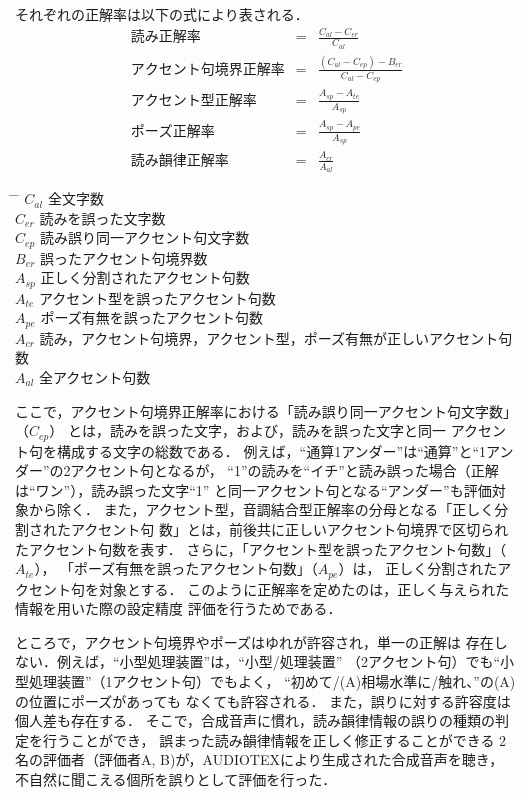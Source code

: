 それぞれの正解率は以下の式により表される．
\begin{eqnarray}
読み正解率
          & = & \frac{C_{al}-C_{er}}{C_{al}} \\
アクセント句境界正解率 
          & = & \frac{(C_{al}-C_{ep})-B_{er}}{C_{al}-C_{ep}} \\
アクセント型正解率
          & = & \frac{A_{sp}-A_{te}}{A_{sp}} \\
ポーズ正解率 
          & = & \frac{A_{sp}-A_{pe}}{A_{sp}}\\
読み韻律正解率
          & = & \frac{A_{cr}}{A_{al}} 
\end{eqnarray}
\begin{small}
\begin{tabbing}
\hspace{1.5cm} \= \hspace{1cm} \= \kill
\> $C_{al}$ \> 全文字数 \\
\> $C_{er}$ \> 読みを誤った文字数 \\
\> $C_{ep}$ \> 読み誤り同一アクセント句文字数 \\
\> $B_{er}$ \> 誤ったアクセント句境界数 \\
\> $A_{sp}$ \> 正しく分割されたアクセント句数 \\
\> $A_{te}$ \> アクセント型を誤ったアクセント句数 \\
\> $A_{pe}$ \> ポーズ有無を誤ったアクセント句数 \\
\> $A_{cr}$ \> 読み，アクセント句境界，アクセント型，ポーズ有無が正しいアクセント句数 \\
\> $A_{al}$ \> 全アクセント句数
\end{tabbing}
\end{small}
ここで，アクセント句境界正解率における「読み誤り同一アクセント句文字数」
（$C_{ep}$）
とは，読みを誤った文字，および，読みを誤った文字と同一
アクセント句を構成する文字の総数である．
例えば，``通算1アンダー''は``通算''と``1アンダー''の2アクセント句となるが，
``1''の読みを``イチ''と読み誤った場合（正解は``ワン''），読み誤った文字``1''
と同一アクセント句となる``アンダー''も評価対象から除く．
また，アクセント型，音調結合型正解率の分母となる「正しく分割されたアクセント句
数」とは，前後共に正しいアクセント句境界で区切られたアクセント句数を表す．
さらに，「アクセント型を誤ったアクセント句数」（$A_{te}$），
「ポーズ有無を誤ったアクセント句数」（$A_{pe}$）は，
正しく分割されたアクセント句を対象とする．
このように正解率を定めたのは，正しく与えられた情報を用いた際の設定精度
評価を行うためである．

ところで，アクセント句境界やポーズはゆれが許容され，単一の正解は
存在しない．例えば，``小型処理装置''は，``小型/処理装置''
（2アクセント句）でも``小型処理装置''（1アクセント句）でもよく，
``初めて/(A)相場水準に/触れ、''の(A)の位置にポーズがあっても
\mbox{なくても許容}される．
また，誤りに対する許容度は個人差も存在する．
そこで，合成音声に慣れ，読み韻律情報の誤りの種類の判定を行うことができ，
誤まった読み韻律情報を正しく修正することができる
2名の評価者（評価者A, B)が，AUDIOTEXにより生成された合成音声を聴き，
不自然に聞こえる個所を誤りとして評価を行った．


